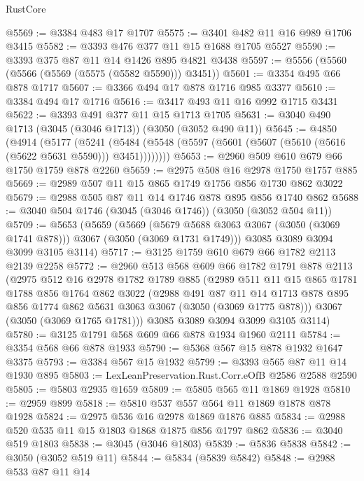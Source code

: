 \begin{lexlean}{RustCore}
\begin{coremodule}
@5569 := @3384 @483 @17 @1707
@5575 := @3401 @482 @11 @16 @989 @1706 @3415
@5582 := @3393 @476 @377 @11 @15 @1688 @1705 @5527
@5590 := @3393 @375 @87 @11 @14 @1426 @895 @4821 @3438
@5597 := @5556 (@5560 (@5566 (@5569 (@5575 (@5582 @5590))) @3451))
@5601 := @3354 @495 @66 @878 @1717
@5607 := @3366 @494 @17 @878 @1716 @985 @3377
@5610 := @3384 @494 @17 @1716
@5616 := @3417 @493 @11 @16 @992 @1715 @3431
@5622 := @3393 @491 @377 @11 @15 @1713 @1705
@5631 := @3040 @490 @1713 (@3045 (@3046 @1713)) (@3050 (@3052 @490 @11))
@5645 := @4850
    (@4914
      (@5177
        (@5241 (@5484 (@5548 (@5597 (@5601 (@5607 (@5610 (@5616 (@5622 @5631 @5590))) @3451))))))))
@5653 := @2960 @509 @610 @679 @66 @1750 @1759 @878 @2260
@5659 := @2975 @508 @16 @2978 @1750 @1757 @885
@5669 := @2989 @507 @11 @15 @865 @1749 @1756 @856 @1730 @862 @3022
@5679 := @2988 @505 @87 @11 @14 @1746 @878 @895 @856 @1740 @862
@5688 := @3040 @504 @1746 (@3045 (@3046 @1746)) (@3050 (@3052 @504 @11))
@5709 := @5653
    (@5659
      (@5669 (@5679 @5688 @3063 @3067 (@3050 (@3069 @1741 @878))) @3067 (@3050 (@3069 @1731 @1749)))
      @3085
      @3089
      @3094
      @3099
      @3105
      @3114)
@5717 := @3125 @1759 @610 @679 @66 @1782 @2113 @2139 @2258
@5772 := @2960
    @513
    @568
    @609
    @66
    @1782
    @1791
    @878
    @2113
    (@2975
      @512
      @16
      @2978
      @1782
      @1789
      @885
      (@2989
        @511
        @11
        @15
        @865
        @1781
        @1788
        @856
        @1764
        @862
        @3022
        (@2988
          @491
          @87
          @11
          @14
          @1713
          @878
          @895
          @856
          @1774
          @862
          @5631
          @3063
          @3067
          (@3050 (@3069 @1775 @878)))
        @3067
        (@3050 (@3069 @1765 @1781)))
      @3085
      @3089
      @3094
      @3099
      @3105
      @3114)
@5780 := @3125 @1791 @568 @609 @66 @878 @1934 @1960 @2111
@5784 := @3354 @568 @66 @878 @1933
@5790 := @5368 @567 @15 @878 @1932 @1647 @3375
@5793 := @3384 @567 @15 @1932
@5799 := @3393 @565 @87 @11 @14 @1930 @895
@5803 := LexLeanPreservation.Rust.Corr.eOfB @2586 @2588 @2590
@5805 := @5803 @2935 @1659
@5809 := @5805 @565 @11 @1869 @1928
@5810 := @2959 @899
@5818 := @5810 @537 @557 @564 @11 @1869 @1878 @878 @1928
@5824 := @2975 @536 @16 @2978 @1869 @1876 @885
@5834 := @2988 @520 @535 @11 @15 @1803 @1868 @1875 @856 @1797 @862
@5836 := @3040 @519 @1803
@5838 := @3045 (@3046 @1803)
@5839 := @5836 @5838
@5842 := @3050 (@3052 @519 @11)
@5844 := @5834 (@5839 @5842)
@5848 := @2988 @533 @87 @11 @14

\end{coremodule}
\end{lexlean}
